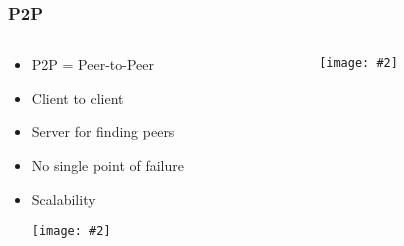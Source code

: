 \documentclass[mathserif,serif,14pt,aspectratio=169]{beamer}
\newcommand{\pic}[2]{
	\centerline{\texttt{[image: \#2]}}
}
\begin{document}
\begin{frame}
	\frametitle{P2P}
	\begin{columns}
		\begin{column}{0.5\textwidth}
			\begin{itemize}\setlength\itemsep{0.3em}
				\item<1-> P2P = Peer-to-Peer
				\item<2-> Client to client
				\item<3-> Server for finding peers
				\item<4-> No single point of failure
				\item<5-> Scalability
			\pic{0.5, trim={5.5cm 2.5cm 3cm 13.5cm}, clip}{assets/cn175.pdf}
			\nocite{01_KuroseJamesF2013Cn:a}
			\end{itemize}
		\end{column}
		\begin{column}{0.5\textwidth}
			\pic{0.65, trim={10cm 10.2cm 1cm 2cm}, clip}{assets/cn114.pdf}
			\nocite{01_KuroseJamesF2013Cn:a}
		\end{column}
	\end{columns}
\end{frame}
\end{document}
